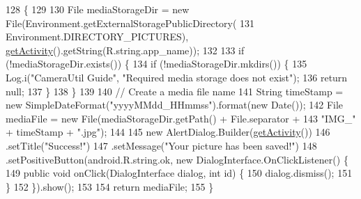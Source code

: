 \begin{DoxyCode}
128                                       \{
129 
130         File mediaStorageDir = \textcolor{keyword}{new} File(Environment.getExternalStoragePublicDirectory(
131                 Environment.DIRECTORY\_PICTURES), \hyperlink{classit_1_1unibo_1_1torsello_1_1bluetoothpositioning_1_1util_1_1CameraUtil_ad49c34169e8267bb8f841d27f0d5804b_ad49c34169e8267bb8f841d27f0d5804b}{getActivity}().getString(R.string.app\_name));
132 
133         \textcolor{keywordflow}{if} (!mediaStorageDir.exists()) \{
134             \textcolor{keywordflow}{if} (!mediaStorageDir.mkdirs()) \{
135                 Log.i(\textcolor{stringliteral}{"CameraUtil Guide"}, \textcolor{stringliteral}{"Required media storage does not exist"});
136                 \textcolor{keywordflow}{return} null;
137             \}
138         \}
139 
140         \textcolor{comment}{// Create a media file name}
141         String timeStamp = \textcolor{keyword}{new} SimpleDateFormat(\textcolor{stringliteral}{"yyyyMMdd\_HHmmss"}).format(\textcolor{keyword}{new} Date());
142         File mediaFile = \textcolor{keyword}{new} File(mediaStorageDir.getPath() + File.separator +
143                 \textcolor{stringliteral}{"IMG\_"} + timeStamp + \textcolor{stringliteral}{".jpg"});
144 
145         \textcolor{keyword}{new} AlertDialog.Builder(\hyperlink{classit_1_1unibo_1_1torsello_1_1bluetoothpositioning_1_1util_1_1CameraUtil_ad49c34169e8267bb8f841d27f0d5804b_ad49c34169e8267bb8f841d27f0d5804b}{getActivity}())
146                 .setTitle(\textcolor{stringliteral}{"Success!"})
147                 .setMessage(\textcolor{stringliteral}{"Your picture has been saved!"})
148                 .setPositiveButton(android.R.string.ok, \textcolor{keyword}{new} DialogInterface.OnClickListener() \{
149                     \textcolor{keyword}{public} \textcolor{keywordtype}{void} onClick(DialogInterface dialog, \textcolor{keywordtype}{int} \textcolor{keywordtype}{id}) \{
150                         dialog.dismiss();
151                     \}
152                 \}).show();
153 
154         \textcolor{keywordflow}{return} mediaFile;
155     \}
\end{DoxyCode}
\hypertarget{classit_1_1unibo_1_1torsello_1_1bluetoothpositioning_1_1util_1_1CameraUtil_ae88de176ab49ea6eafa5864701ecc748_ae88de176ab49ea6eafa5864701ecc748}{}\label{classit_1_1unibo_1_1torsello_1_1bluetoothpositioning_1_1util_1_1CameraUtil_ae88de176ab49ea6eafa5864701ecc748_ae88de176ab49ea6eafa5864701ecc748} 
